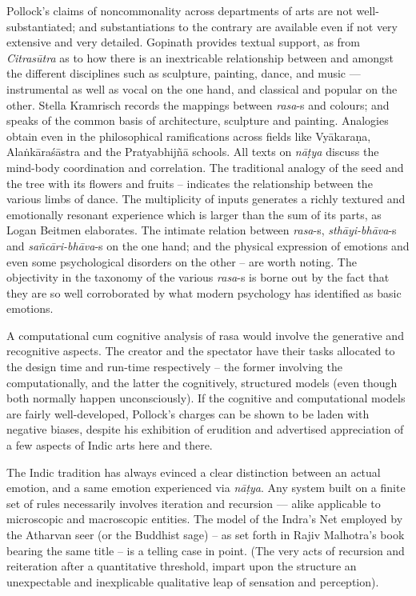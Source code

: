 Pollock’s claims of noncommonality across departments of arts are not well-substantiated; and substantiations to the contrary are available even if not very extensive and very detailed. Gopinath provides textual support, as from \textsl{Citrasūtra} as to how there is an inextricable relationship between and amongst the different disciplines such as sculpture, painting, dance, and music --- instrumental as well as vocal on the one hand, and classical and popular on the other. Stella Kramrisch records the mappings between \textsl{rasa}-s and colours; and speaks of the common basis of architecture, sculpture and painting. Analogies obtain even in the philosophical ramifications across fields like Vyākaraṇa, Alaṅkāraśāstra and the Pratyabhijñā schools. All texts on \textsl{nāṭya} discuss the mind-body coordination and correlation. The traditional analogy of the seed and the tree with its flowers and fruits -- indicates the relationship between the various limbs of dance. The multiplicity of inputs generates a richly textured and emotionally resonant experience which is larger than the sum of its parts, as Logan Beitmen elaborates. The intimate relation between \textsl{rasa}-s, \textsl{sthāyi-bhāva}-s and \textsl{sañcāri-bhāva}-s on the one hand; and the physical expression of emotions and even some psychological disorders on the other -- are worth noting. The objectivity in the taxonomy of the various \textsl{rasa}-s is borne out by the fact that they are so well corroborated by what modern psychology has identified as basic emotions.

A computational cum cognitive analysis of rasa would involve the generative and recognitive aspects. The creator and the spectator have their tasks allocated to the design time and run-time respectively -- the former involving the computationally, and the latter the cognitively, structured models (even though both normally happen unconsciously). If the cognitive and computational models are fairly well-developed,  Pollock’s charges can be shown to be laden with negative biases, despite his exhibition of erudition and advertised appreciation of a few aspects of Indic arts here and there.

The Indic tradition has always evinced a clear distinction between an actual emotion, and a same emotion experienced via \textsl{nāṭya}. Any system built on a finite set of rules necessarily involves iteration and recursion --- alike applicable to microscopic and macroscopic entities. The model of the Indra’s Net employed by the Atharvan seer (or the Buddhist sage) -- as set forth in Rajiv Malhotra’s book bearing the same title -- is a telling case in point. (The very acts of recursion and reiteration after a quantitative threshold, impart upon the structure an unexpectable and inexplicable qualitative leap of sensation and perception).

